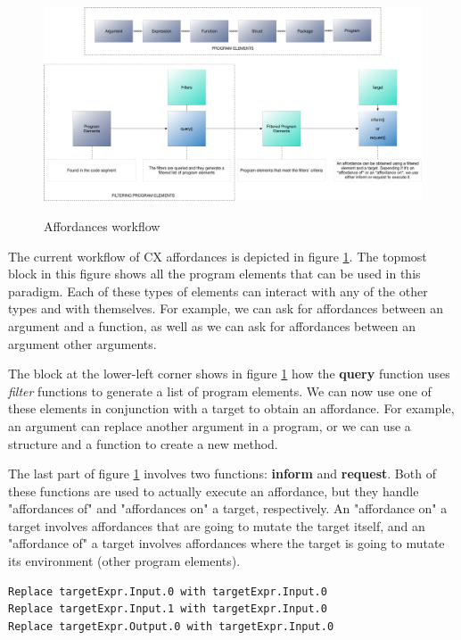 \documentclass[11pt,fleqn,openany]{book} %
\begin{document}
\begin{figure}
\caption{Affordances workflow}
\centering
\includegraphics[width=1.0\textwidth]{img/affordances.png}
\label{figure:affordances-workflow}
\end{figure}

The current workflow of CX affordances is depicted in figure \ref{figure:affordances-workflow}. The topmost block in this figure shows all the program elements that can be used in this paradigm. Each of these types of elements can interact with any of the other types and with themselves. For example, we can ask for affordances between an argument and a function, as well as we can ask for affordances between an argument other arguments.

The block at the lower-left corner shows in figure \ref{figure:affordances-workflow} how the \textbf{query} function uses \emph{filter} functions to generate a list of program elements. We can now use one of these elements in conjunction with a target to obtain an affordance. For example, an argument can replace another argument in a program, or we can use a structure and a function to create a new method.

The last part of figure \ref{figure:affordances-workflow} involves two functions: \textbf{inform} and \textbf{request}. Both of these functions are used to actually execute an affordance, but they handle "affordances of" and "affordances on" a target, respectively. An "affordance on" a target involves affordances that are going to mutate the target itself, and an "affordance of" a target involves affordances where the target is going to mutate its environment (other program elements).

\begin{lstlisting}[caption={A list of "affordances of" an argument},captionpos=b,label={listing:affordances-of}]
Replace targetExpr.Input.0 with targetExpr.Input.0
Replace targetExpr.Input.1 with targetExpr.Input.0
Replace targetExpr.Output.0 with targetExpr.Input.0
\end{lstlisting}
\end{document}
